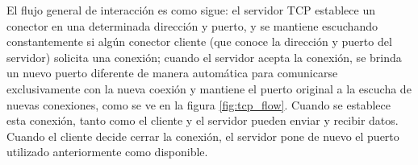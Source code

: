 



El flujo general de interacción es como sigue: el servidor TCP establece un conector en una determinada dirección y puerto, y se mantiene escuchando constantemente si algún conector cliente (que conoce la dirección y puerto del servidor) solicita una conexión; cuando el servidor acepta la conexión, se brinda un nuevo puerto diferente de manera automática para comunicarse exclusivamente con la nueva coexión y mantiene el puerto original a la escucha de nuevas conexiones, como se ve en la figura \ref{fig:tcp_flow}. Cuando se establece esta conexión, tanto como el cliente y el servidor pueden enviar y recibir datos. Cuando el cliente decide cerrar la conexión, el servidor pone de nuevo el puerto utilizado anteriormente como disponible.\\

